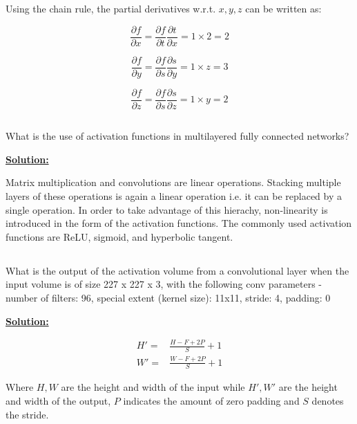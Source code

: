 \documentclass[a4paper,10pt]{article}
\begin{document}
Using the chain rule, the partial derivatives w.r.t. $x, y, z$ can be written as:

\begin{equation}
\frac{\partial f}{\partial x} = \frac{\partial f}{\partial t} \frac{\partial t}{\partial x} = 1 \times 2 = 2
\end{equation}

\begin{equation}
\frac{\partial f}{\partial y} = \frac{\partial f}{\partial s} \frac{\partial s}{\partial y} = 1 \times z = 3
\end{equation}

\begin{equation}
\frac{\partial f}{\partial z} = \frac{\partial f}{\partial s} \frac{\partial s}{\partial z} = 1 \times y = 2
\end{equation}

\subsection{}
What is the use of activation functions in multilayered fully connected networks?

\textbf{\underline{Solution:}} 

Matrix multiplication and convolutions are linear operations. Stacking multiple layers of these operations is again a linear operation i.e. it can be replaced by a single operation. 
In order to take advantage of this hierachy, non-linearity is introduced in the form of the activation functions. The commonly used activation functions are ReLU, sigmoid, and hyperbolic tangent.

\subsection{}
What is the output of the activation volume from a convolutional layer when the input volume is of size 227 x 227 x 3, with the following conv parameters - number of filters: 96, special extent (kernel size): 11x11, stride: 4, padding: 0

\textbf{\underline{Solution:}} 

\begin{align}
H' =& \frac{H - F + 2P}{S} + 1 \\
W' =& \frac{W - F + 2P}{S} + 1
\end{align}

Where $H, W$ are the height and width of the input while $H', W'$ are the height and width of the output, $P$ indicates the amount of zero padding and $S$ denotes the stride.
\end{document}
